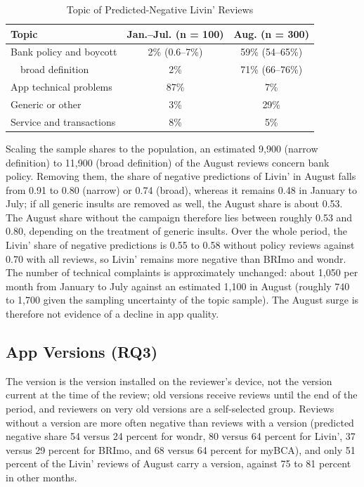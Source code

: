 \documentclass[conference]{IEEEtran}
\begin{document}
\begin{table}[htbp]
\caption{Topic of Predicted-Negative Livin' Reviews}
\begin{center}
\footnotesize
\begin{tabular}{|l|c|c|}
\hline
\textbf{Topic} & \textbf{Jan.--Jul. (n = 100)} & \textbf{Aug. (n = 300)} \\
\hline
Bank policy and boycott & 2\% (0.6--7\%) & 59\% (54--65\%) \\
\ \ broad definition & 2\% & 71\% (66--76\%) \\
App technical problems & 87\% & 7\% \\
Generic or other & 3\% & 29\% \\
Service and transactions & 8\% & 5\% \\
\hline
\end{tabular}
\label{tab:topics}
\end{center}
\end{table}

Scaling the sample shares to the population, an estimated 9,900 (narrow definition) to 11,900 (broad definition) of the August reviews concern bank policy. Removing them, the share of negative predictions of Livin' in August falls from 0.91 to 0.80 (narrow) or 0.74 (broad), whereas it remains 0.48 in January to July; if all generic insults are removed as well, the August share is about 0.53. The August share without the campaign therefore lies between roughly 0.53 and 0.80, depending on the treatment of generic insults. Over the whole period, the Livin' share of negative predictions is 0.55 to 0.58 without policy reviews against 0.70 with all reviews, so Livin' remains more negative than BRImo and wondr. The number of technical complaints is approximately unchanged: about 1,050 per month from January to July against an estimated 1,100 in August (roughly 740 to 1,700 given the sampling uncertainty of the topic sample). The August surge is therefore not evidence of a decline in app quality.

\subsection{App Versions (RQ3)}
The version is the version installed on the reviewer's device, not the version current at the time of the review; old versions receive reviews until the end of the period, and reviewers on very old versions are a self-selected group. Reviews without a version are more often negative than reviews with a version (predicted negative share 54 versus 24 percent for wondr, 80 versus 64 percent for Livin', 37 versus 29 percent for BRImo, and 68 versus 64 percent for myBCA), and only 51 percent of the Livin' reviews of August carry a version, against 75 to 81 percent in other months.
\end{document}
